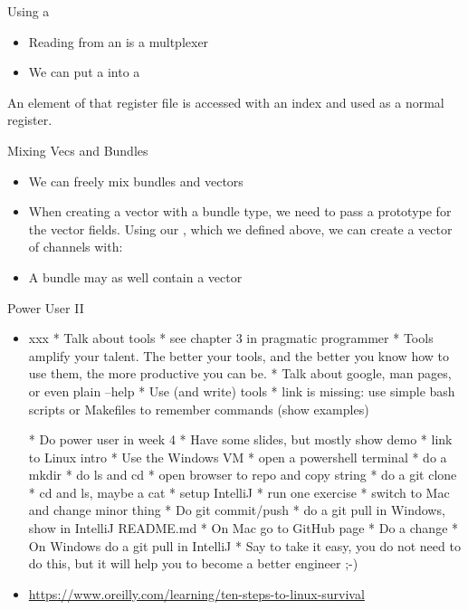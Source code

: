 \begin{frame}[fragile]{Using a }
\begin{itemize}
\item Reading from an  is a multplexer
\item We can put a  into a 
\end{itemize}
\noindent An element of that register file is accessed with an index and used as a normal register.

\end{frame}


\begin{frame}[fragile]{Mixing Vecs and Bundles}
\begin{itemize}
\item We can freely mix bundles and vectors
\item When creating a vector with a bundle
type, we need to pass a prototype for the vector fields. Using our
, which we defined above, we can create a vector of channels with:
\end{itemize}
\begin{itemize}
\item A bundle may as well contain a vector
\end{itemize}
\end{frame}

\begin{frame}[fragile]{Power User II}
\begin{itemize}
\item xxx
 * Talk about tools
   * see chapter 3 in pragmatic programmer
   * Tools amplify your talent. The better your tools, and the better you know how to use them, the more productive you can be.
   * Talk about google, man pages, or even plain --help
 * Use (and write) tools
 * link is missing: use simple bash scripts or Makefiles to remember commands (show examples)


 * Do power user in week 4
 * Have some slides, but mostly show demo
 * link to Linux intro
 * Use the Windows VM
 * open a powershell terminal
 * do a mkdir
 * do ls and cd
 * open browser to repo and copy string
 * do a git clone
 * cd and ls, maybe a cat
 * setup IntelliJ
 * run one exercise
 * switch to Mac and change minor thing
 * Do git commit/push
 * do a git pull in Windows, show in IntelliJ README.md
 * On Mac go to GitHub page
 * Do a change
 * On Windows do a git pull in IntelliJ
 * Say to take it easy, you do not need to do this, but it will help you to become a better engineer ;-)
\item \url{https://www.oreilly.com/learning/ten-steps-to-linux-survival}

\end{itemize}
\end{frame}

